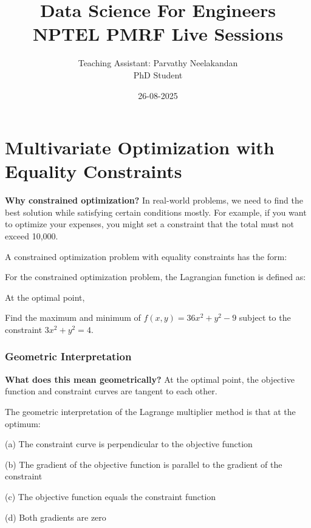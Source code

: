 \documentclass[11pt,a4paper]{article}
\title{\color{blue}Data Science For Engineers\\NPTEL PMRF Live Sessions\\}
\author{Teaching Assistant: Parvathy Neelakandan\\PhD Student}
\date{26-08-2025}
\theoremstyle{definition}
\begin{document}
\maketitle

\section*{Multivariate Optimization with Equality Constraints}

\textbf{Why constrained optimization?}
In real-world problems, we need to find the best solution while satisfying certain conditions mostly. 
For example, if you want to optimize your expenses, you might set a constraint that the total must not exceed 10,000.

\begin{defbox}
A constrained optimization problem with equality constraints has the form:
\vspace{50mm}
\end{defbox}


\begin{defbox}
For the constrained optimization problem, the Lagrangian function is defined as:
\vspace{30mm}
\end{defbox}

\begin{defbox}
At the optimal point,
\vspace{40mm}
\end{defbox}

\begin{examplebox}
Find the maximum and minimum of $ f(x,y) = 36x^2 + y^2-9$ subject to the constraint $3x^2 + y^2 =4$.
\vspace{50mm}
\end{examplebox}

\subsubsection*{Geometric Interpretation}
\noindent \textbf{What does this mean geometrically?}
At the optimal point, the objective function and constraint curves are tangent to each other. 
\begin{quesbox}[Question]

The geometric interpretation of the Lagrange multiplier method is that at the optimum:

(a) The constraint curve is perpendicular to the objective function

(b) The gradient of the objective function is parallel to the gradient of the constraint

(c) The objective function equals the constraint function

(d) Both gradients are zero
\end{quesbox}
\end{document}
